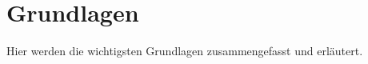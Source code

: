 \section{Grundlagen} \label{sec:grundlagen}
Hier werden die wichtigsten Grundlagen zusammengefasst und erläutert.